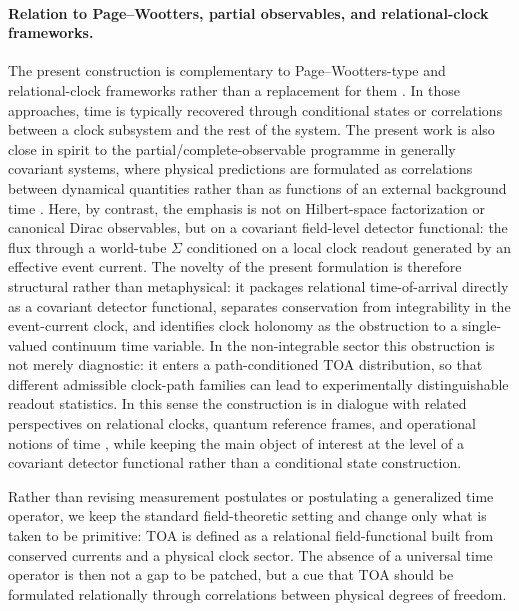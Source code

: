 \documentclass[pdflatex,sn-mathphys-num]{sn-jnl}
\theoremstyle{thmstylethree}
\theoremstyle{thmstyleone}
\theoremstyle{thmstyletwo}
\numberwithin{equation}{section}
\begin{document}
        \paragraph{Relation to Page--Wootters, partial observables, and relational-clock frameworks.}
            The present construction is complementary to Page--Wootters-type and relational-clock frameworks rather than a replacement for them \cite{PageWootters1983,Wootters1984}. In those approaches, time is typically recovered through conditional states or correlations between a clock subsystem and the rest of the system. The present work is also close in spirit to the partial/complete-observable programme in generally covariant systems, where physical predictions are formulated as correlations between dynamical quantities rather than as functions of an external background time \cite{Rovelli2002PartialObservables,Dittrich2007PartialComplete,Tambornino2012RelationalObservables,Marolf1995AlmostIdealClocks}. Here, by contrast, the emphasis is not on Hilbert-space factorization or canonical Dirac observables, but on a covariant field-level detector functional: the flux through a world-tube $\Sigma$ conditioned on a local clock readout generated by an effective event current. The novelty of the present formulation is therefore structural rather than metaphysical: it packages relational time-of-arrival directly as a covariant detector functional, separates conservation from integrability in the event-current clock, and identifies clock holonomy as the obstruction to a single-valued continuum time variable. In the non-integrable sector this obstruction is not merely diagnostic: it enters a path-conditioned TOA distribution, so that different admissible clock-path families can lead to experimentally distinguishable readout statistics. In this sense the construction is in dialogue with related perspectives on relational clocks, quantum reference frames, and operational notions of time \cite{GambiniPullin2021,HohnSmith2020,Giovannetti2015}, while keeping the main object of interest at the level of a covariant detector functional rather than a conditional state construction.
            
            Rather than revising measurement postulates or postulating a generalized time operator, we keep the standard field-theoretic setting and change only what is taken to be primitive: TOA is defined as a relational field-functional built from conserved currents and a physical clock sector. The absence of a universal time operator is then not a gap to be patched, but a cue that TOA should be formulated relationally through correlations between physical degrees of freedom.
\end{document}
